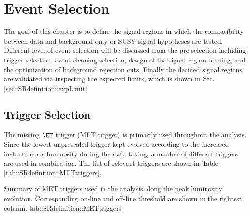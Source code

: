 \chapter{Event Selection} \label{sec::SRdefinition}
The goal of this chapter is to define the signal regions in which the compatibility between data and background-only or SUSY signal hypotheses are tested. 
Different level of event selection will be discussed from the pre-selection including trigger selection, event cleaning selection, design of the signal region binning, and the optimization of background rejection cuts.
Finally the decided signal regions are validated via inspecting the expected limits,
which is shown in Sec. \ref{sec::SRdefinition::expLimit}.\\


\section{Trigger Selection} \label{sec::SRdefinition::trigger}
The missing $\ET$ trigger (MET trigger) is primarily used throughout the analysis.
Since the lowest unprescaled trigger kept evolved according to the increased instantaneous luminosity during the data taking, a number of different triggers are used in combination.
The list of relevant triggers are shown in Table \ref{tab::SRdefinition::METtriggers},

{Summary of MET triggers used in the analysis along the peak luminosity evolution. Corresponding on-line and off-line threshold are shown in the rightest column.}
{tab::SRdefinition::METtriggers}

